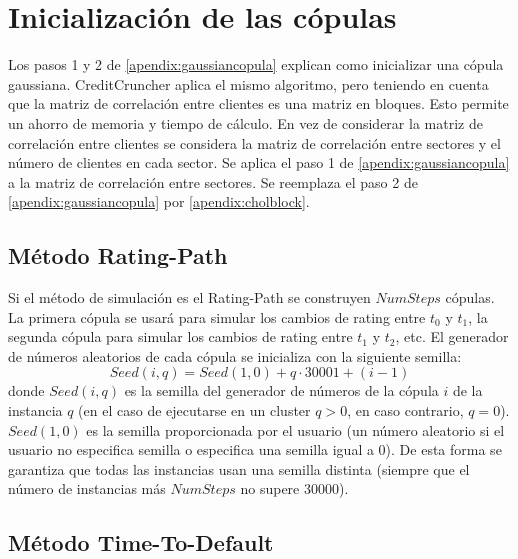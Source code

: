 \section{Inicializaci\'on de las c\'opulas}

Los pasos 1 y 2 de \ref{apendix:gaussiancopula} explican como
inicializar una c\'opula gaussiana. CreditCruncher aplica el 
mismo algoritmo, pero teniendo en cuenta que la matriz de
correlaci\'on entre clientes es una matriz en bloques. Esto
permite un ahorro de memoria y tiempo de c\'alculo. En vez de
considerar la matriz de correlaci\'on entre clientes se
considera la matriz de correlaci\'on entre sectores y el
n\'umero de clientes en cada sector. Se aplica el paso 1
de \ref{apendix:gaussiancopula} a la matriz de correlaci\'on
entre sectores. Se reemplaza el paso 2 de \ref{apendix:gaussiancopula}
por \ref{apendix:cholblock}.


\subsection{M\'etodo Rating-Path}

Si el m\'etodo de simulaci\'on es el Rating-Path se construyen
$NumSteps$ c\'opulas. La primera c\'opula se usar\'a para simular
los cambios de rating entre $t_0$ y $t_1$, la segunda c\'opula
para simular los cambios de rating entre $t_1$ y $t_2$, etc.
\newline
\newline
El generador de n\'umeros aleatorios de cada c\'opula se
inicializa con la siguiente semilla:
\begin{displaymath}
Seed(i,q) = Seed(1,0) + q \cdot 30001 + (i-1)
\end{displaymath}
donde $Seed(i,q)$ es la semilla del generador de n\'umeros de la
c\'opula $i$ de la instancia $q$ (en el caso de ejecutarse en un
cluster $q>0$, en caso contrario, $q=0$). $Seed(1,0)$ es la semilla
proporcionada por el usuario (un n\'umero aleatorio si el usuario no
especifica semilla o especifica una semilla igual a 0). De esta
forma se garantiza que todas las instancias usan una semilla distinta
(siempre que el n\'umero de instancias m\'as $NumSteps$ no supere 30000).

\subsection{M\'etodo Time-To-Default}

